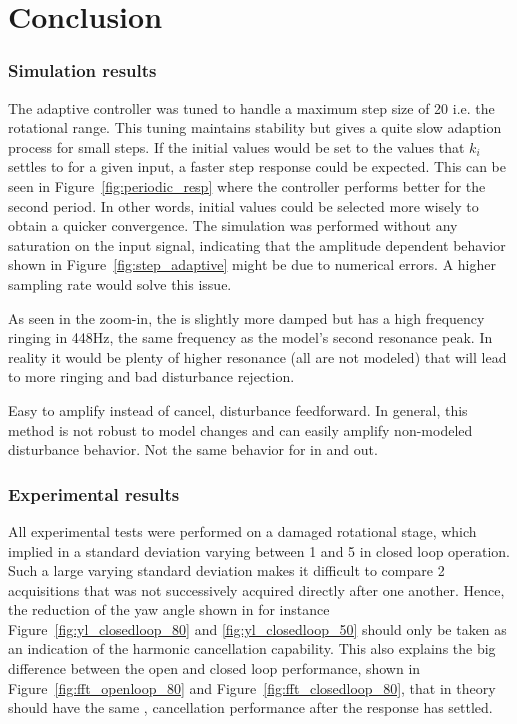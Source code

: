 \chapter{Conclusion}\label{cha:conclusion}


\subsection{Simulation results}
The adaptive controller was tuned to handle a maximum step size of \unit{20}{\milli\radian} i.e. the rotational range. This tuning maintains stability but gives a quite slow adaption process for small steps. If the initial values would be set to the values that $k_i$ settles to for a given input, a faster step response could be expected. This can be seen in Figure~\ref{fig:periodic_resp} where the controller performs better for the second period. In other words, initial values could be selected more wisely to obtain a quicker convergence.  The simulation was performed without any saturation on the input signal, indicating that the amplitude dependent behavior shown in Figure~\ref{fig:step_adaptive} might be due to numerical errors. A higher sampling rate would solve this issue. 



As seen in the zoom-in, the \abbrIRC is slightly more damped but has a high frequency ringing in 448Hz, the same frequency as the model's second resonance peak. In reality it would be plenty of  higher resonance (all are not modeled) that will lead to more ringing and bad disturbance rejection.

Easy to amplify instead of cancel, disturbance feedforward.  In general, this method is not robust to model changes and can easily amplify non-modeled disturbance behavior. Not the same behavior for in and out.

\subsection{Experimental results}
All experimental tests were performed on a damaged rotational stage, which implied in a standard deviation varying between \unit{1}{\micro\radian} and \unit{5}{\micro\radian} in closed loop operation. Such a large varying standard deviation makes it difficult to compare 2 acquisitions that was not successively acquired directly after one another. Hence, the reduction of the yaw angle shown in for instance Figure~\ref{fig:yl_closedloop_80} and \ref{fig:yl_closedloop_50} should only be taken as an indication of the harmonic cancellation capability. This also explains the big difference between the open and closed loop performance, shown in Figure~\ref{fig:fft_openloop_80} and Figure~\ref{fig:fft_closedloop_80}, that in theory should have the same , cancellation performance after the response has settled.

